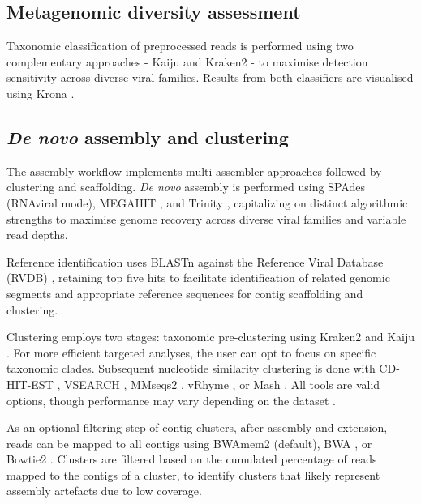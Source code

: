 \subsection{Metagenomic diversity assessment}

Taxonomic classification of preprocessed reads is performed using two complementary approaches - Kaiju \citep{Menzel2016-tz} and Kraken2 \citep{Wood2019-jl} - to maximise detection sensitivity across diverse viral families. Results from both classifiers are visualised using Krona \citep{Ondov2011-yp}.

\subsection{{\it De novo} assembly and clustering}

The assembly workflow implements multi-assembler approaches followed by clustering and scaffolding. \textit{De novo} assembly is performed using SPAdes \citep{Meleshko2021-gb} (RNAviral mode), MEGAHIT \citep{Li2016-sd}, and Trinity \citep{Grabherr2011-ef}, capitalizing on distinct algorithmic strengths to maximise genome recovery across diverse viral families and variable read depths.

Reference identification uses BLASTn \citep{Altschul1990-sy} against the Reference Viral Database (RVDB) \citep{Goodacre2018-dw}, retaining top five hits to facilitate identification of related genomic segments and appropriate reference sequences for contig scaffolding and clustering.

Clustering employs two stages: taxonomic pre-clustering using Kraken2 \citep{Wood2019-jl} and Kaiju \citep{Menzel2016-tz}. For more efficient targeted analyses, the user can opt to focus on specific taxonomic clades. Subsequent nucleotide similarity clustering is done with CD-HIT-EST \citep{Li2006-nj}, VSEARCH \citep{Rognes2016-ju}, MMseqs2 \citep{Steinegger2017-ci}, vRhyme \citep{Kieft2022-km}, or Mash \citep{Ondov2019-bo}. All tools are valid options, though performance may vary depending on the dataset \citep{Zielezinski2025-vl,Steinegger2017-ci}.

As an optional filtering step of contig clusters, after assembly and extension, reads can be mapped to all contigs using BWAmem2 \citep{Vasimuddin2019-rb} (default), BWA \citep{Li2013-pp}, or Bowtie2 \citep{Langmead2019-wx}. Clusters are filtered based on the cumulated percentage of reads mapped to the contigs of a cluster, to identify clusters that likely represent assembly artefacts due to low coverage.

